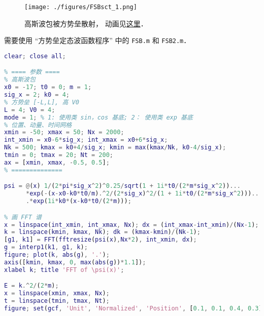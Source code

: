 
\begin{issues}
\issueDraft
{}
\end{issues}


\begin{figure}[ht]
\centering
\texttt{[image: ./figures/FSBsct\_1.png]}
\caption{高斯波包被方势垒散射， 动画见\href{https://wuli.wiki/apps/FSBsct.html}{这里}．} \label{FSBsct_fig1}
\end{figure}

需要使用 “方势垒定态波函数程序” 中的 \verb|FSB.m| 和 \verb|FSB2.m|．
\begin{lstlisting}[language=matlab, caption=FSBsct.m]
% 方势垒散射高斯波包
clear; close all;

% ==== 参数 ====
% 高斯波包
x0 = -17; t0 = 0; m = 1;
sig_x = 2; k0 = 4;
% 方势垒 [-L,L], 高 V0
L = 4; V0 = 4;
mode = 1; % 1: 使用类 sin，cos 基底; 2： 使用类 exp 基底
% 位置、动量、时间网格
xmin = -50; xmax = 50; Nx = 2000;
int_xmin = x0-6*sig_x; int_xmax = x0+6*sig_x;
Nk = 500; kmax = k0+4/sig_x; kmin = max(kmax/Nk, k0-4/sig_x);
tmin = 0; tmax = 20; Nt = 200;
ax = [xmin, xmax, -0.5, 0.5];
% ==============

psi = @(x) 1/(2*pi*sig_x^2)^0.25/sqrt(1 + 1i*t0/(2*m*sig_x^2))...
      *exp(-(x-x0-k0*t0/m).^2/(2*sig_x)^2/(1 + 1i*t0/(2*m*sig_x^2)))...
      .*exp(1i*k0*(x-k0*t0/(2*m)));

% 画 FFT 谱
x = linspace(int_xmin, int_xmax, Nx); dx = (int_xmax-int_xmin)/(Nx-1);
k = linspace(kmin, kmax, Nk); dk = (kmax-kmin)/(Nk-1);
[g1, k1] = FFT(fftresize(psi(x),Nx*2), int_xmin, dx);
g = interp1(k1, g1, k);
figure; plot(k, abs(g), '.');
axis([kmin, kmax, 0, max(abs(g))*1.1]);
xlabel k; title 'FFT of \psi(x)';

E = k.^2/(2*m);
x = linspace(xmin, xmax, Nx);
t = linspace(tmin, tmax, Nt);
figure; set(gcf, 'Unit', 'Normalized', 'Position', [0.1, 0.1, 0.4, 0.3]);


\end{lstlisting}
